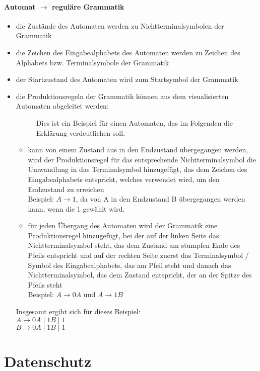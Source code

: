 \documentclass{article}
\begin{document}
	\paragraph{Automat $\rightarrow$ reguläre Grammatik}
	\begin{itemize}
		\item die Zustände des Automaten werden zu Nichtterminalsymbolen der Grammatik
		\item die Zeichen des Eingabealphabets des Automaten werden zu Zeichen des Alphabets bzw. Terminalsymbole der Grammatik
		\item der Startzustand des Automaten wird zum Startsymbol der Grammatik
		\item die Produktionsregeln der Grammatik können aus dem visualisierten Automaten abgeleitet werden: 
		\begin{figure}[H]
			\centering
			
			\caption{Dies ist ein Beispiel für einen Automaten, das im Folgenden die Erklärung verdeutlichen soll.}
		\end{figure}	
		\begin{itemize}
			\item kann von einem Zustand aus in den Endzustand übergegangen werden, wird der Produktionsregel für das entsprechende Nichtterminalsymbol die Umwandlung in das Terminalsymbol hinzugefügt, das dem Zeichen des Eingabealphabets entspricht, welches verwendet wird, um den Endzustand zu erreichen \\
			Beispiel: $A \rightarrow 1$, da von A in den Endzustand B übergegangen werden kann, wenn die 1 gewählt wird.
			\item für jeden Übergang des Automaten wird der Grammatik eine Produktionsregel hinzugefügt, bei der auf der linken Seite das Nichtterminalsymbol steht, das dem Zustand am stumpfen Ende des Pfeils entspricht und auf der rechten Seite zuerst das Terminalsymbol / Symbol des Eingabealphabets, das am Pfeil steht und danach das Nichtterminalsymbol, das dem Zustand entspricht, der an der Spitze des Pfeils steht \\
			Beispiel: $A \rightarrow 0A$ und $A \rightarrow 1B$
		\end{itemize}
		Insgesamt ergibt sich für dieses Beispiel: \\
		$A \rightarrow 0A \mid 1B \mid 1$ \\
		$B \rightarrow 0A \mid 1B \mid 1$
	\end{itemize}

	\section{Datenschutz}
\end{document}

